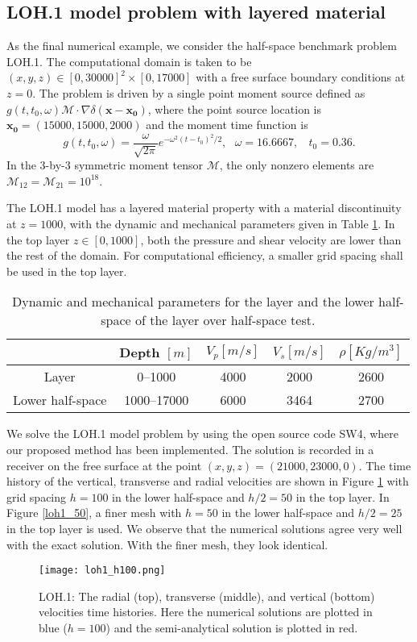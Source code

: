 \subsection{LOH.1 model problem with layered material}
As the final numerical example, we consider the half-space benchmark problem LOH.1. The computational domain is taken to be $(x,y,z)\in[0,30000]^2\times[0,17000]$ with a free surface boundary conditions at $z=0$.   The problem is driven by a single point moment source defined as 
$g(t,t_0,\omega) \mathcal{M} \cdot \nabla\delta (\mathbf{x}-\mathbf{x_0})$, 
where the point source location is $\mathbf{x_0}= (15000, 15000, 2000)$  and the moment time function is
\[g(t,t_0,\omega) = \frac{\omega}{\sqrt{2\pi}}e^{-\omega^2(t - t_0)^2/2}, \ \ \ \omega = 16.6667,\ \ \ \ t_0 = 0.36.\]
In the 3-by-3 symmetric moment tensor $\mathcal{M}$, the only nonzero elements are $\mathcal{M}_{12}=\mathcal{M}_{21}=10^{18}$.

The LOH.1 model has a layered material property with a material discontinuity at $z=1000$, with the dynamic and mechanical parameters given in Table \ref{material_parameter}. In the top layer $z\in [0, 1000]$, both the pressure and shear velocity are lower than the rest of the domain. For computational efficiency, a smaller grid spacing shall be used in the top layer. 

\begin{table}[htbp]
	\begin{center}
		\begin{tabular}{c c c c c}
			\hline
			~   & Depth $[m]$& $V_p[m/s]$ & $V_s [m/s]$ & $\rho[Kg/m^3]$ \\
			\hline
			Layer&0--1000& 4000& 2000& 2600\\
			Lower half-space &1000--17000 & 6000 & 3464& 2700\\
			\hline 
		\end{tabular}
	\end{center}
	\caption{Dynamic and mechanical parameters for the layer and the lower half-space of the layer over half-space test.}\label{material_parameter}
\end{table} 

We solve the LOH.1 model problem by using the open source code SW4, where our proposed method has been implemented. The solution is recorded in a receiver on the free surface at the point $(x, y, z) = (21000, 23000, 0)$. The time history of the vertical, transverse and radial velocities are shown in Figure \ref{loh1_100} with grid spacing $h = 100$ in the lower half-space and $h/2 = 50$ in the top layer. In Figure \ref{loh1_50}, a finer mesh with $h = 50$ in the lower half-space and $h/2 = 25$ in the top layer is used. We observe that the numerical solutions agree very well with the exact solution. With the finer mesh, they look identical.
\begin{figure}[htbp]
	\centering
	\texttt{[image: loh1\_h100.png]}
	\caption{LOH.1: The radial (top), transverse (middle), and vertical (bottom) velocities time histories. Here the numerical solutions are plotted in blue ($h = 100$) and the semi-analytical solution is plotted in red.}\label{loh1_100}
\end{figure}

